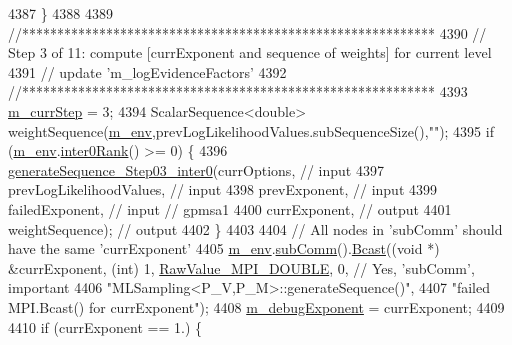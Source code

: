 \begin{DoxyCode}
{{4387     \}
4388 
4389     \textcolor{comment}{//***********************************************************}
4390     \textcolor{comment}{// Step 3 of 11: compute [currExponent and sequence of weights] for current level}
4391     \textcolor{comment}{//               update 'm\_logEvidenceFactors'}
4392     \textcolor{comment}{//***********************************************************}
4393     \hyperlink{class_q_u_e_s_o_1_1_m_l_sampling_a1b1f8ccb4823bdfa26ec652f0807c63e}{m\_currStep} = 3;
4394     ScalarSequence<double> weightSequence(\hyperlink{class_q_u_e_s_o_1_1_m_l_sampling_a13f1ca4fe9f94822fe572a743eaced1d}{m\_env},prevLogLikelihoodValues.subSequenceSize(),\textcolor{stringliteral}{""});
4395     \textcolor{keywordflow}{if} (\hyperlink{class_q_u_e_s_o_1_1_m_l_sampling_a13f1ca4fe9f94822fe572a743eaced1d}{m\_env}.\hyperlink{class_q_u_e_s_o_1_1_base_environment_ae106b5bb8a80b655b88b3a26b1e7c185}{inter0Rank}() >= 0) \{
4396       \hyperlink{class_q_u_e_s_o_1_1_m_l_sampling_ae53e6bc0ec5d1f3d3ac9df268086cd75}{generateSequence\_Step03\_inter0}(currOptions,             \textcolor{comment}{// input}
4397                                      prevLogLikelihoodValues, \textcolor{comment}{// input}
4398                                      prevExponent,            \textcolor{comment}{// input}
4399                                      failedExponent,          \textcolor{comment}{// input // gpmsa1}
4400                                      currExponent,            \textcolor{comment}{// output}
4401                                      weightSequence);         \textcolor{comment}{// output}
4402     \}
4403 
4404     \textcolor{comment}{// All nodes in 'subComm' should have the same 'currExponent'}
4405     \hyperlink{class_q_u_e_s_o_1_1_m_l_sampling_a13f1ca4fe9f94822fe572a743eaced1d}{m\_env}.\hyperlink{class_q_u_e_s_o_1_1_base_environment_affe39f53e3d5d678842413370af09145}{subComm}().\hyperlink{class_q_u_e_s_o_1_1_mpi_comm_abd6af8db8b0c7fd2f5b62e26477a9537}{Bcast}((\textcolor{keywordtype}{void} *) &currExponent, (\textcolor{keywordtype}{int}) 1, 
      \hyperlink{_mpi_comm_8h_ad0f503bd9fecfe4e570ca3d15aaf2518}{RawValue\_MPI\_DOUBLE}, 0, \textcolor{comment}{// Yes, 'subComm', important}
4406                           \textcolor{stringliteral}{"MLSampling<P\_V,P\_M>::generateSequence()"},
4407                           \textcolor{stringliteral}{"failed MPI.Bcast() for currExponent"});
4408     \hyperlink{class_q_u_e_s_o_1_1_m_l_sampling_abdd5cd35419283c33cc40a77d0f4f07f}{m\_debugExponent} = currExponent;
4409 
4410     \textcolor{keywordflow}{if} (currExponent == 1.) \{
}}
\end{DoxyCode}
